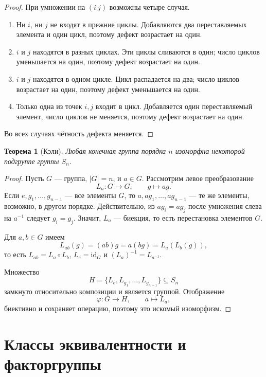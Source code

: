 \documentclass[12pt,a4paper,oneside,openany]{book}
\theoremstyle{definition}
\theoremstyle{plain}
\newtheorem{theorem}{Теорема}[chapter]
\theoremstyle{remark}
\begin{document}
\begin{proof}
При умножении на $(i\ j)$ возможны четыре случая.
\begin{enumerate}[label=\arabic*)]
  \item Ни $i$, ни $j$ не входят в прежние циклы. Добавляются два
  переставляемых элемента и один цикл, поэтому дефект возрастает на один.
  \item $i$ и $j$ находятся в разных циклах. Эти циклы сливаются в один;
  число циклов уменьшается на один, поэтому дефект возрастает на один.
  \item $i$ и $j$ находятся в одном цикле. Цикл распадается на два;
  число циклов возрастает на один, поэтому дефект уменьшается на один.
  \item Только одна из точек $i,j$ входит в цикл. Добавляется один
  переставляемый элемент, число циклов не меняется, поэтому дефект
  возрастает на один.
\end{enumerate}
Во всех случаях чётность дефекта меняется.
\end{proof}

\begin{theorem}[Кэли]
Любая конечная группа порядка $n$ изоморфна некоторой подгруппе группы
$S_n$.
\end{theorem}

\begin{proof}
Пусть $G$ --- группа, $|G|=n$, и $a\in G$. Рассмотрим левое
преобразование
\[
  L_a\colon G\to G,\qquad g\mapsto ag.
\]
Если $e,g_1,\ldots,g_{n-1}$ --- все элементы $G$, то
$a,ag_1,\ldots,ag_{n-1}$ --- те же элементы, возможно, в другом порядке.
Действительно, из $ag_i=ag_j$ после умножения слева на $a^{-1}$ следует
$g_i=g_j$. Значит, $L_a$ --- биекция, то есть перестановка элементов $G$.


Для $a,b\in G$ имеем
\[
  L_{ab}(g)=(ab)g=a(bg)=L_a(L_b(g)),
\]
то есть $L_{ab}=L_a\circ L_b$, $L_e=\mathrm{id}_G$ и
$(L_a)^{-1}=L_{a^{-1}}$.

Множество
\[
  H=\{L_e,L_{g_1},\ldots,L_{g_{n-1}}\}\subseteq S_n
\]
замкнуто относительно композиции и является группой. Отображение
\[
\varphi\colon G\to H,\qquad a\mapsto L_a,
\]
биективно и сохраняет операцию, поэтому это искомый изоморфизм.
\end{proof}

\section{Классы эквивалентности и факторгруппы}
\end{document}
